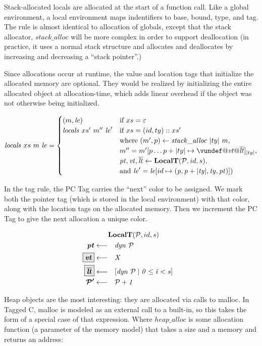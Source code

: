 \documentclass[acmsmall,review,anonymous]{acmart}\settopmatter{printfolios=true,printccs=false,printacmref=false}
\begin{document}
Stack-allocated locals are allocated at the start of a function call. Like a global environment,
a local environment maps indentifiers to base, bound, type, and tag. The rule is almost identical
to allocation of globals, except that the stack allocator, \(\mathit{stack\_alloc}\) will be more
complex in order to support deallocation (in practice, it uses a normal stack structure and allocates
and deallocates by increasing and decreasing a ``stack pointer''.)

Since allocations occur at runtime, the value and location tags that initialize the allocated memory
are optional. They would be realized by initializing the entire allocated object at allocation-time,
which adds linear overhead if the object was not otherwise being initialized.

\[\mathit{locals} ~ xs ~ \mem ~ \lenv =
\begin{cases}
  (\mem, \lenv) & \textnormal{if } xs = \varepsilon \\
  \mathit{locals} ~ xs' ~ \mem'' ~ \lenv' & \textnormal{if } xs = (id,ty)::xs' \\
  & \textnormal{where } (\mem',p) \leftarrow \mathit{stack\_alloc} ~ |ty| ~ \mem, \\
  & \mem'' = \mem'[p \dots p+|ty| \mapsto \vundef@\vt@\overline{\lt}]_{|ty|}, \\
  & \trule{\localtres}{\localt}, \\
  & \textnormal{and } \lenv' = \lenv[id \mapsto (\mathit{p, p+|ty|,ty,\pt})]) \\
\end{cases}\]
              
In the tag rule, the PC Tag carries the ``next'' color to be assigned. We mark both the pointer tag
(which is stored in the local environment) with that color, along with the location tags on the
allocated memory. Then we increment the PC Tag to give the next allocation a unique color.

\[\begin{aligned}
\truledef{\localt}
\settag{\pt}{dyn ~ \PCT}
\settagopt{\vt}{X}
\settagopt{\overline{\lt}}{\left[dyn ~ \PCT \mid 0 \leq i < s\right]}
\settag{\PCT'}{\PCT+1}
\end{aligned}\]
         
Heap objects are the most interesting: they are allocated via calls to malloc.
In Tagged C, malloc is modeled as an external call to a built-in, so this takes the form
of a special case of that expression. Where \(\mathit{heap\_alloc}\) is some allocation
function (a parameter of the memory model) that takes a size and a memory and returns an address:
\end{document}
